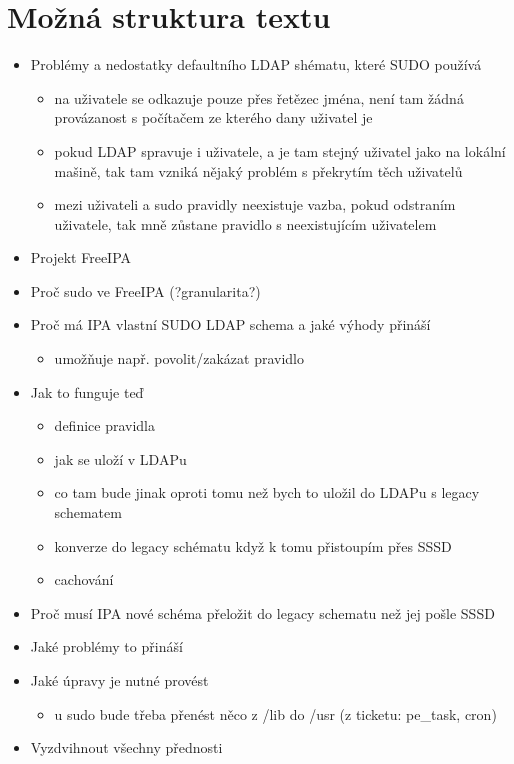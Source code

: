 \documentclass[12pt,a4paper,titlepage,final]{article}
\begin{document}
\section*{Možná struktura textu}
\begin{itemize}
	\item Problémy a nedostatky defaultního LDAP shématu, které SUDO používá
	\begin{itemize}
					\item na uživatele se odkazuje pouze přes řetězec jména, není tam žádná
									provázanost s počítačem ze kterého dany uživatel je
					\item pokud LDAP spravuje i uživatele, a je tam stejný uživatel jako na
									lokální mašině, tak tam vzniká nějaký problém s překrytím těch uživatelů
					\item mezi uživateli a sudo pravidly neexistuje vazba, pokud odstraním
									uživatele, tak mně zůstane pravidlo s neexistujícím uživatelem
	\end{itemize}
	\item Projekt FreeIPA
	\item Proč sudo ve FreeIPA (?granularita?)
	\item Proč má IPA vlastní SUDO LDAP schema a jaké výhody přináší

	\begin{itemize}
					\item umožňuje např. povolit/zakázat pravidlo
	\end{itemize}
					
	\item Jak to funguje teď

	\begin{itemize}
					\item definice pravidla
					\item jak se uloží v LDAPu
					\item co tam bude jinak oproti tomu než bych to uložil do LDAPu s legacy
									schematem
					\item konverze do legacy schématu když k tomu přistoupím přes SSSD
					\item cachování
	\end{itemize}
	\item Proč musí IPA nové schéma přeložit do legacy schematu než jej pošle
					SSSD
	\item Jaké problémy to přináší
	\item Jaké úpravy je nutné provést
	\begin{itemize}
					\item u sudo bude třeba přenést něco z /lib do /usr (z ticketu: pe\_task,
									cron)
	\end{itemize}
	\item Vyzdvihnout všechny přednosti
\end{itemize} 
\end{document}

